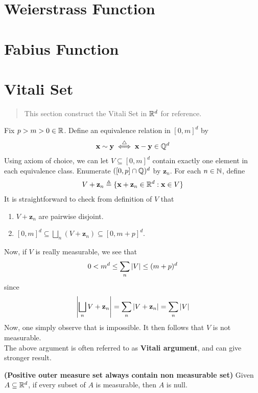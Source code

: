 \documentclass{report}
\begin{document}
\section{Weierstrass Function}
\section{Fabius Function}
\section{Vitali Set}
\label{Vitali Set}
\begin{abstract}
This section construct the Vitali Set in $\mathbb{R}^d$ for reference.
\end{abstract}
\begin{mdframed}
Fix $p>m>0\in\mathbb{R}$. Define an equivalence relation in $[0,m]^d$ by 
\begin{align*}
\textbf{x}\sim  \textbf{y}\overset{\triangle}{\iff }\textbf{x}-\textbf{y}\in\mathbb{Q}^d
\end{align*}
Using axiom of choice, we can let $V\subseteq [0,m]^d$ contain exactly one element in each equivalence class. Enumerate $([0,p]\cap \mathbb{Q})^d$ by $\textbf{z}_n$. For each $n\in\mathbb{N}$, define 
\begin{align*}
V+\textbf{z}_n \triangleq \{ \textbf{x}+\textbf{z}_n\in\mathbb{R}^d: \textbf{x}\in V \}
\end{align*}
It is straightforward to check from definition of $V$ that 
\begin{enumerate}[label=(\alph*)]
  \item $V+\textbf{z}_n$ are pairwise disjoint. 
  \item $[0,m]^d \subseteq \bigsqcup_n (V+\textbf{z}_n)\subseteq [0,m+p]^d$. 
\end{enumerate}
Now, if $V$ is really measurable, we see that 
\begin{align}
\label{con}
0<m^d\leq \sum_n \left|V\right|\leq (m+p)^d
\end{align}
since 
\begin{align*}
\left|\bigsqcup_n  V+\textbf{z}_n\right|= \sum_n \left|V+\textbf{z}_n\right|=\sum_n \left|V\right|
\end{align*}
Now, one simply observe that   is impossible. It then follows that $V$ is not measurable.\\

The above argument is often referred to as \textbf{Vitali argument}, and can give stronger result. 
\end{mdframed}
\begin{theorem}
\textbf{(Positive outer measure set always contain non measurable set)} Given $A\subseteq \mathbb{R}^d$, if every subset of $A$ is measurable, then $A$ is null.  
\end{theorem}
\end{document}
